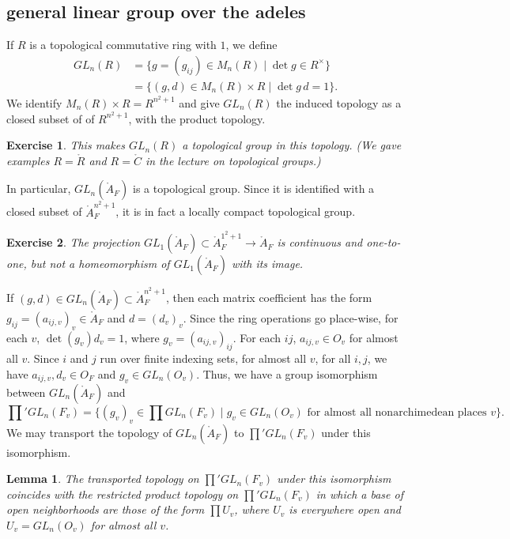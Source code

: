 \documentclass{amsart}
\newtheorem{lemma}[equation]{Lemma}
\newtheorem{exercise}{Exercise}
\def\CC{\ring{C}}
\def\RR{\ring{R}}
\def\AA{\ring{A}}
\begin{document}
\subsection{general linear group over the adeles}

If $R$ is a topological commutative ring with $1$, we define
\begin{align*}
GL_n(R) &= \{g = (g_{ij}) \in M_n(R) \mid \det g \in R^\times\}\\
   &= \{(g,d)\in M_n(R)\times R\mid \det g \, d = 1\}.
\end{align*}
We identify $M_n(R) \times R = R^{n^2 + 1}$ and give $GL_n(R)$ the induced topology
as a closed subset of of $R^{n^2+1}$, with the product topology. 

\begin{exercise}
This makes $GL_n(R)$ a topological group in this topology.  (We gave examples
$R=\RR$ and $R=\CC$ in the lecture on topological groups.)
\end{exercise}

In particular, $GL_n(\AA_F)$ is a topological group.  Since it is identified with
a closed subset of $\AA_F^{n^2+1}$, it is in fact a locally compact topological group.

\begin{exercise}
The projection $GL_1(\AA_F) \subset \AA_F^{1^2+1}\to \AA_F$ is continuous and one-to-one, 
but not a homeomorphism of $GL_1(\AA_F)$ with its image.
\end{exercise}

If $(g,d)\in GL_n(\AA_F)\subset \AA_F^{n^2+1}$, 
then each matrix coefficient has the form $g_{ij} = (a_{ij,v})_v\in \AA_F$ and
$d = (d_v)_v$.  Since the ring operations go place-wise,
for each $v$, $\det(g_v) d_v = 1$, where $g_v= (a_{ij,v})_{ij}$.
For each $i j$, $a_{ij, v}\in O_v$ for almost all $v$.  Since $i$ and $j$ run over finite indexing
sets, for almost all $v$, for all $i, j$, we have  $a_{ij,v}, d_v\in O_F$ and $g_v\in GL_n(O_v)$.
Thus, we have a group isomorphism between $GL_n(\AA_F)$ and
\[
\prod' GL_n(F_v) = \{ (g_v)_v\in \prod GL_n(F_v) \mid g_v\in GL_n(O_v) \text{ for almost all
 nonarchimedean places } v\}.
\]
We may transport the topology of $GL_n(\AA_F)$ to $\prod' GL_n(F_v)$ under this isomorphism.

\begin{lemma}  The transported topology on $\prod' GL_n(F_v)$ under this isomorphism coincides
with the restricted product topology on $\prod' GL_n(F_v)$ in which a base of open neighborhoods
are those of the form $\prod U_v$, where $U_v$ is everywhere open and $U_v = GL_n(O_v)$
for almost all $v$.
\end{lemma}
\end{document}
